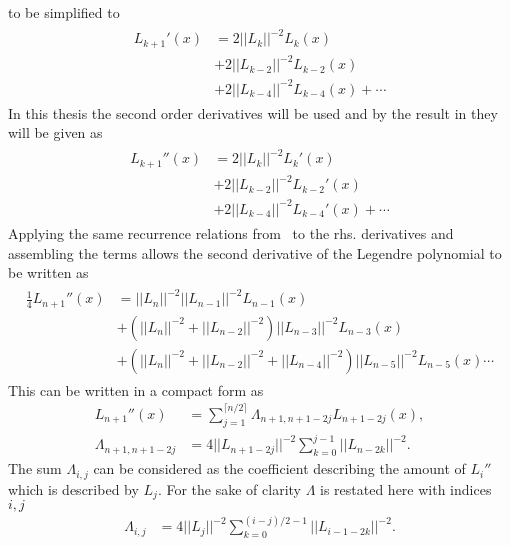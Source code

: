 to be simplified to 
\begin{align}
    \begin{split}
    L_{k+1}'(x) &= 2||L_k||^{-2}L_k(x)\\
    &+2||L_{k-2}||^{-2}L_{k-2}(x)\\
    &+2||L_{k-4}||^{-2}L_{k-4}(x)+\cdots 
    \end{split}
    \label{eq:der-explicit1}
\end{align}
In this thesis the second order derivatives will be used and by the result in  they will be given as 
\begin{align}
    \begin{split}
    L_{k+1}''(x) &= 2||L_k||^{-2}L_k'(x)\\
    &+2||L_{k-2}||^{-2}L_{k-2}'(x)\\
    &+2||L_{k-4}||^{-2}L_{k-4}'(x)+\cdots 
    \end{split}
    \label{eq:der-explicit2}
\end{align}
Applying the same recurrence relations from~ to the rhs. derivatives and assembling the terms allows the 
second derivative of the Legendre polynomial to be written as 
\begin{align}
    \begin{split}
        \frac{1}{4}L_{n+1}''(x) &= ||L_n||^{-2}||L_{n-1}||^{-2}L_{n-1}(x)\\
        &+\left( ||L_n||^{-2}+||L_{n-2}||^{-2} \right)||L_{n-3}||^{-2}L_{n-3}(x)\\
        &+\left( ||L_n||^{-2}+||L_{n-2}||^{-2}+||L_{n-4}||^{-2} \right)||L_{n-5}||^{-2}L_{n-5}(x) \cdots
    \end{split}
    \label{eq:laplacian-explicit}
\end{align}
This can be written in a compact form as
\begin{align}
    L_{n+1}''(x) &= \sum_{j=1}^{\lceil n/2 \rceil}\Lambda_{n+1,n+1-2j}L_{n+1-2j}(x),\\
    \Lambda_{n+1,n+1-2j} &= 4||L_{n+1-2j}||^{-2}\sum_{k=0}^{j-1}||L_{n-2k}||^{-2}.
    \label{eq:legendresummation}
\end{align}
The sum $\Lambda_{i,j}$ can be considered as the coefficient describing the amount of $L_i''$ 
which is described by $L_j$. For the sake of clarity $\Lambda$ is restated here with indices $i,j$
\begin{align}
    \Lambda_{i,j} &= 4||L_{j}||^{-2}\sum_{k=0}^{(i-j)/2-1}||L_{i-1-2k}||^{-2}.
    \label{eq:legendresummation}
\end{align}
